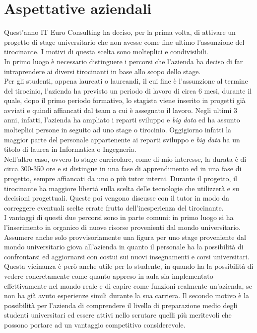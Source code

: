 \section{Aspettative aziendali}
Quest'anno IT Euro Consulting ha deciso, per la prima volta, di attivare un progetto di stage universitario che non avesse come fine ultimo l'assunzione del tirocinante. I motivi di questa scelta sono molteplici e condivisibili. \\
In primo luogo è necessario distinguere i percorsi che l'azienda ha deciso di far intraprendere ai diversi tirocinanti in base allo scopo dello stage. \\ 
Per gli studenti, appena laureati o laureandi, il cui fine è l'assunzione al termine del tirocinio, l'azienda ha previsto un periodo di lavoro di circa 6 mesi, durante il quale, dopo il primo periodo formativo, lo stagista viene inserito in progetti già avviati e quindi affiancati dal team a cui è assegnato il lavoro. Negli ultimi 3 anni, infatti, l'azienda ha ampliato i reparti sviluppo e \textit{big data} ed ha assunto molteplici persone in seguito ad uno stage o tirocinio. Oggigiorno infatti la maggior parte del personale appartenente ai reparti sviluppo e \textit{big data} ha un titolo di laurea in Informatica o Ingegneria. \\
Nell'altro caso, ovvero lo stage curricolare, come di mio interesse, la durata è di circa 300-350 ore e si distingue in una fase di apprendimento ed in una fase di progetto, sempre affiancati da uno o più tutor interni. Durante il progetto, il tirocinante ha maggiore libertà sulla scelta delle tecnologie che utilizzerà e su decisioni progettuali. Queste poi vengono discusse con il tutor in modo da correggere eventuali scelte errate frutto dell'inesperienza del tirocinante. \\
I vantaggi di questi due percorsi sono in parte comuni: in primo luogo si ha l'inserimento in organico di nuove risorse provenienti dal mondo universitario. Assumere anche solo provvisoriamente una figura per uno stage proveniente dal mondo universitario giova all'azienda in quanto il personale ha la possibilità di confrontarsi ed aggiornarsi con costui sui nuovi insegnamenti e corsi universitari. Questa vicinanza è però anche utile per lo studente, in quando ha la possibilità di vedere concretamente come quanto appreso in aula sia implementato effettivamente nel mondo reale e di capire come funzioni realmente un'azienda, se non ha già avuto esperienze simili durante la sua carriera.
Il secondo motivo è la possibilità per l'azienda di comprendere il livello di preparazione medio degli studenti universitari ed essere attivi nello scrutare quelli più meritevoli che possono portare ad un vantaggio competitivo considerevole.
